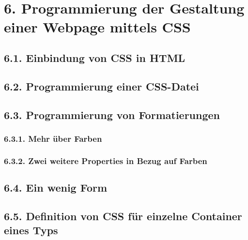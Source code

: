 \chapter{6.	Programmierung der Gestaltung einer Webpage mittels CSS}
\section{6.1.	Einbindung von CSS in HTML}
\section{6.2.	Programmierung einer CSS-Datei}
\section{6.3.	Programmierung von Formatierungen}
\subsection{6.3.1.	Mehr über Farben}
\subsection{6.3.2.	Zwei weitere Properties in Bezug auf Farben}
\section{6.4.	Ein wenig Form}
\section{6.5.	Definition von CSS für einzelne Container eines Typs}
